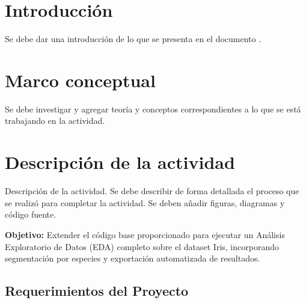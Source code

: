 \documentclass[11pt,letterpaper]{article}
\begin{document}
\portada
\indicegeneral


\section{Introducción}

Se debe dar una introducción de lo que se presenta en el documento \parencite{fisher1936}.

\section{Marco conceptual}

Se debe investigar y agregar teoría y conceptos correspondientes a lo que se está trabajando en la actividad.

\section{Descripción de la actividad}

Descripción de la actividad. Se debe describir de forma detallada el proceso que se realizó para completar la actividad. Se deben añadir figuras, diagramas y código fuente.

\textbf{Objetivo:} Extender el código base proporcionado para ejecutar un Análisis Exploratorio de Datos (EDA) completo sobre el dataset Iris, incorporando segmentación por especies y exportación automatizada de resultados.

\subsection*{Requerimientos del Proyecto}
\end{document}
